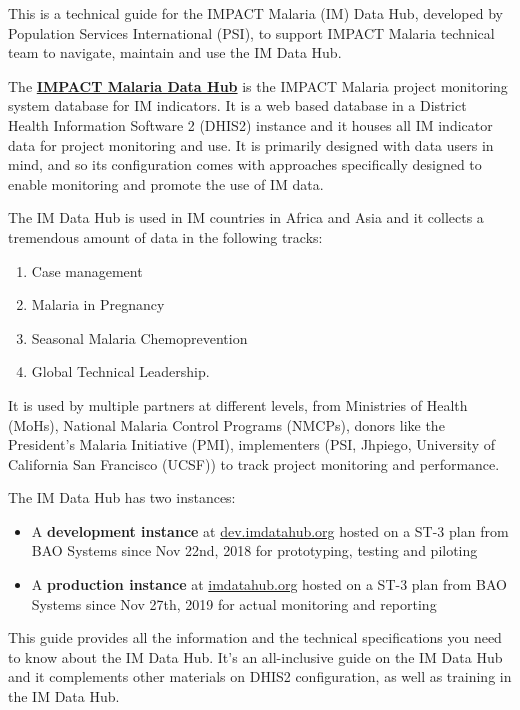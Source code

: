 \documentclass[]{book}
\providecommand{\tightlist}{%
  \setlength{\itemsep}{0pt}\setlength{\parskip}{0pt}}
\begin{document}
This is a technical guide for the IMPACT Malaria (IM) Data Hub, developed by Population Services International (PSI), to support IMPACT Malaria technical team to navigate, maintain and use the IM Data Hub.

The \href{https://imdatahub.org}{\textbf{IMPACT Malaria Data Hub}} is the IMPACT Malaria project monitoring system database for IM indicators. It is a web based database in a District Health Information Software 2 (DHIS2) instance and it houses all IM indicator data for project monitoring and use. It is primarily designed with data users in mind, and so its configuration comes with approaches specifically designed to enable monitoring and promote the use of IM data.

The IM Data Hub is used in IM countries in Africa and Asia and it collects a tremendous amount of data in the following tracks:

\begin{enumerate}
\def\labelenumi{\arabic{enumi}.}
\tightlist
\item
  Case management
\item
  Malaria in Pregnancy
\item
  Seasonal Malaria Chemoprevention
\item
  Global Technical Leadership.
\end{enumerate}

It is used by multiple partners at different levels, from Ministries of Health (MoHs), National Malaria Control Programs (NMCPs), donors like the President's Malaria Initiative (PMI), implementers (PSI, Jhpiego, University of California San Francisco (UCSF)) to track project monitoring and performance.

The IM Data Hub has two instances:

\begin{itemize}
\tightlist
\item
  A \textbf{development instance} at \href{https://dev.imdatahub.org}{dev.imdatahub.org} hosted on a ST-3 plan from BAO Systems since Nov 22nd, 2018 for prototyping, testing and piloting
\item
  A \textbf{production instance} at \href{https://imdatahub.org}{imdatahub.org} hosted on a ST-3 plan from BAO Systems since Nov 27th, 2019 for actual monitoring and reporting
\end{itemize}

This guide provides all the information and the technical specifications you need to know about the IM Data Hub. It's an all-inclusive guide on the IM Data Hub and it complements other materials on DHIS2 configuration, as well as training in the IM Data Hub.
\end{document}
